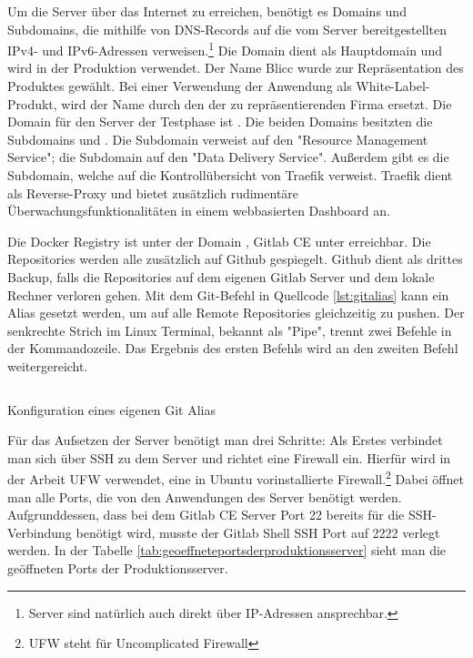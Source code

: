 Um die Server über das Internet zu erreichen, benötigt es Domains
und Subdomains, die mithilfe von DNS-Records auf die vom Server bereitgestellten
IPv4- und IPv6-Adressen verweisen.\footnote{Server sind natürlich auch
direkt über IP-Adressen ansprechbar.} Die Domain  dient als
Hauptdomain und wird in der Produktion verwendet. Der Name Blicc
wurde zur Repräsentation des Produktes gewählt. Bei einer Verwendung der Anwendung
als White-Label-Produkt, wird der Name durch den der
zu repräsentierenden Firma ersetzt. Die Domain für den
Server der Testphase ist . Die beiden Domains besitzten die
Subdomains  und . Die Subdomain  verweist auf
den "Resource Management Service"; die Subdomain  auf den "Data Delivery Service".
Außerdem gibt es die  Subdomain, welche auf die Kontrollübersicht von Traefik
verweist. Traefik dient als Reverse-Proxy und bietet zusätzlich rudimentäre
Überwachungsfunktionalitäten in einem webbasierten Dashboard an.

Die Docker Registry ist unter der Domain , Gitlab CE
unter  erreichbar. Die Repositories werden alle zusätzlich
auf Github gespiegelt. Github dient als drittes Backup, falls die Repositories auf dem
eigenen Gitlab Server und dem lokale Rechner verloren gehen. Mit dem Git-Befehl in
Quellcode \ref{lst:gitalias} kann ein Alias gesetzt werden, um auf alle Remote Repositories
gleichzeitig zu pushen. Der senkrechte Strich im Linux Terminal, bekannt als "Pipe",
trennt zwei Befehle in der Kommandozeile. Das Ergebnis des ersten Befehls wird
an den zweiten Befehl weitergereicht.

\begin{listing}
    \inputminted{sh}{snippets/sh/pushall.sh}
    \caption{Konfiguration eines eigenen Git Alias}
    \label{lst:gitalias}
\end{listing}

Für das Aufsetzen der Server benötigt man drei Schritte:
Als Erstes verbindet man sich über SSH zu dem Server und richtet eine Firewall ein.
Hierfür wird in der Arbeit UFW verwendet, eine in Ubuntu vorinstallierte
Firewall.\footnote{UFW steht für Uncomplicated Firewall} Dabei öffnet man alle Ports,
die von den Anwendungen des Server benötigt werden. Aufgrunddessen, dass bei dem Gitlab CE Server
Port 22 bereits für die SSH-Verbindung benötigt wird, musste der Gitlab Shell SSH
Port auf 2222 verlegt werden. In der Tabelle \ref{tab:geoeffneteportsderproduktionsserver}
sieht man die geöffneten Ports der Produktionsserver.


